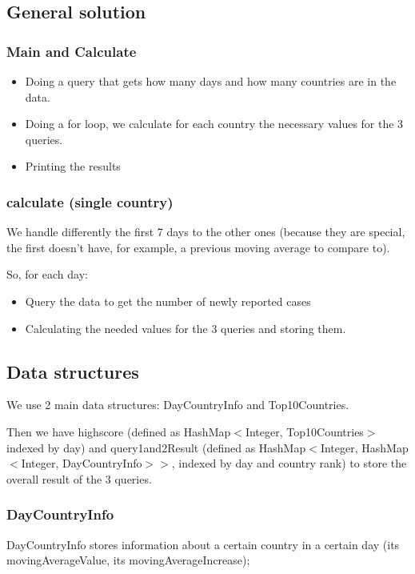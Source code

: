 \documentclass[table, 12pt]{article}
\begin{document}
\subsection{General solution}
\subsubsection{Main and Calculate}

\begin{itemize}
\setlength\itemsep{-0.5em}
\item Doing a query that gets how many days and how many countries are in the data.
\item Doing a for loop, we calculate for each country the necessary values for the 3 queries.
\item Printing the results
\end{itemize}

\subsubsection{calculate (single country)}

We handle differently the first 7 days to the other ones (because they are special, the first doesn’t have, for example, a previous moving average to compare to).

So, for each day:

\begin{itemize}
\setlength\itemsep{-0.5em}
\item Query the data to get the number of newly reported cases
\item Calculating the needed values for the 3 queries and storing them.
\end{itemize}

\subsection{Data structures}
We use 2 main data structures: DayCountryInfo and Top10Countries.

Then we have highscore (defined as HashMap$<$Integer, Top10Countries$>$ indexed by day) and query1and2Result (defined as HashMap$<$Integer, HashMap$<$Integer, DayCountryInfo$>>$, indexed by day and country rank) to store the overall result of the 3 queries.

\subsubsection{DayCountryInfo}
DayCountryInfo stores information about a certain country in a certain day (its movingAverageValue, its movingAverageIncrease);
\end{document}
